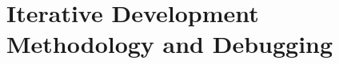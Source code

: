 \documentclass[a4paper,12pt]{report}
\begin{document}










\section{Iterative Development Methodology and Debugging}
\end{document}
